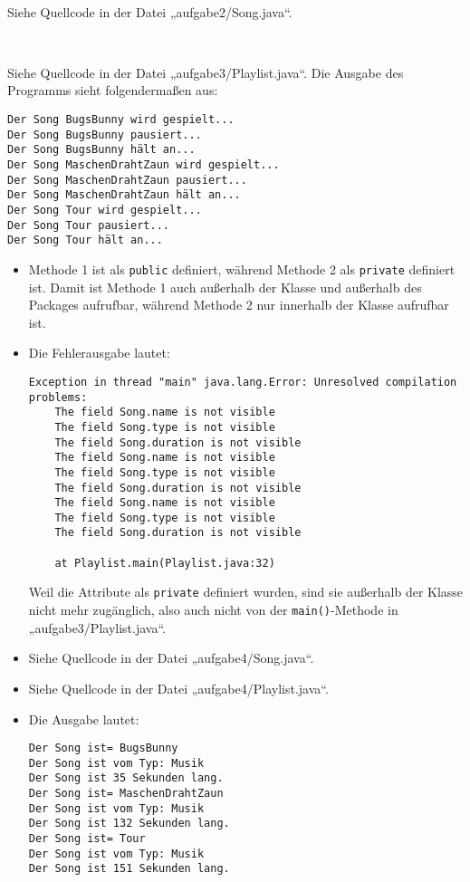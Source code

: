 \documentclass[a4paper]{scrartcl}
\begin{document}
\setcounter{aufgabe}{1}

\begin{aufgabe}~

	Siehe Quellcode in der Datei „aufgabe2/Song.java“.
\end{aufgabe}

\begin{aufgabe}~

	Siehe Quellcode in der Datei „aufgabe3/Playlist.java“.
	Die Ausgabe des Programms sieht folgendermaßen aus:
	\begin{verbatim}
Der Song BugsBunny wird gespielt...
Der Song BugsBunny pausiert...
Der Song BugsBunny hält an...
Der Song MaschenDrahtZaun wird gespielt...
Der Song MaschenDrahtZaun pausiert...
Der Song MaschenDrahtZaun hält an...
Der Song Tour wird gespielt...
Der Song Tour pausiert...	
Der Song Tour hält an...
	\end{verbatim}
\end{aufgabe}

\begin{aufgabe}
	\begin{itemize}
		\item
			Methode 1 ist als \verb|public| definiert, während Methode 2 als \verb|private| definiert ist.
			Damit ist Methode 1 auch außerhalb der Klasse und außerhalb des Packages aufrufbar, während Methode 2 nur innerhalb der Klasse aufrufbar ist.
		\item
			Die Fehlerausgabe lautet:
			\begin{verbatim}
Exception in thread "main" java.lang.Error: Unresolved compilation problems: 
	The field Song.name is not visible
	The field Song.type is not visible
	The field Song.duration is not visible
	The field Song.name is not visible
	The field Song.type is not visible
	The field Song.duration is not visible
	The field Song.name is not visible
	The field Song.type is not visible
	The field Song.duration is not visible

	at Playlist.main(Playlist.java:32)	
			\end{verbatim}
			Weil die Attribute als \verb|private| definiert wurden, sind sie außerhalb der Klasse nicht mehr zugänglich, also auch nicht von der \verb|main()|-Methode in „aufgabe3/Playlist.java“.
		\item
			Siehe Quellcode in der Datei „aufgabe4/Song.java“.
		\item
			Siehe Quellcode in der Datei „aufgabe4/Playlist.java“.
		\item
			Die Ausgabe lautet:
			\begin{verbatim}
Der Song ist= BugsBunny
Der Song ist vom Typ: Musik
Der Song ist 35 Sekunden lang.
Der Song ist= MaschenDrahtZaun
Der Song ist vom Typ: Musik
Der Song ist 132 Sekunden lang.
Der Song ist= Tour
Der Song ist vom Typ: Musik
Der Song ist 151 Sekunden lang.	
			\end{verbatim}
	\end{itemize}
\end{aufgabe}
\end{document}

